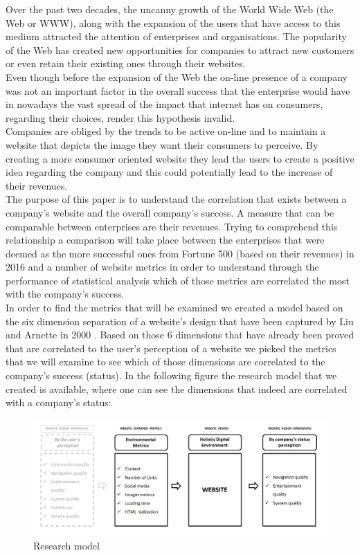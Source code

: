 \documentclass{book}
\begin{document}
Over the past two decades, the uncanny growth of the World Wide Web (the Web or WWW), along with the expansion of the users that have access to this medium attracted the attention of enterprises and organisations. The popularity of the Web has created new opportunities for companies to attract new customers or even retain their existing ones through their websites.\\ 
Even though before the expansion of the Web the on-line presence of a company was not an important factor in the overall success that the enterprise would have in nowadays the vast spread of the impact that internet has on consumers, regarding their choices, render this hypothesis invalid.\\
Companies are obliged by the trends to be active on-line and to maintain a website that depicts the image they want their consumers to perceive. By creating a more consumer oriented website they lead the users to create a positive idea regarding the company and this could potentially lead to the increase of their revenues.\\
The purpose of this paper is to understand the correlation that exists between a company's website and the overall company's success. A measure that can be comparable between enterprises are their revenues. Trying to comprehend this relationship a comparison will take place between the enterprises that were deemed as the more successful ones from Fortune 500 (based on their revenues) in 2016 and a number of website metrics in order to understand through the performance of statistical analysis which of those metrics are correlated the most with the company's success.\\
In order to find the metrics that will be examined we created a model based on the six dimension separation of a website's design that have been captured by Liu and Arnette in 2000 \cite{key9}. Based on those 6 dimensions that have already been proved that are correlated to the user's perception of a website we picked the metrics that we will examine to see which of those dimensions are correlated to the company's success (status). In the following figure the research model that we created is available, where one can see the dimensions that indeed are correlated with a company's status:
\begin{figure}[H]
\centering
\caption{Research model}
\begin{center}
\includegraphics[scale=0.4]{../R/photos/001_model_framework.png} 
\end{center}
\end{figure}
\end{document}
